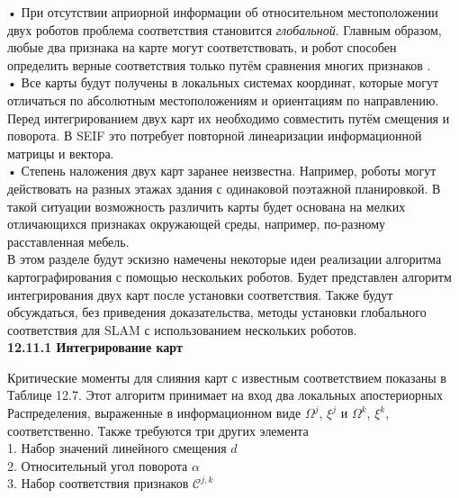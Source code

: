 \documentclass[10pt,a4paper]{article}
\begin{document}
•	При отсутствии априорной информации об относительном местоположении двух роботов проблема соответствия становится \textit{глобальной}. Главным образом, любые два признака на карте могут соответствовать, и робот способен определить верные соответствия только путём сравнения многих признаков .\\

•	Все карты будут получены в локальных системах координат, которые могут отличаться по абсолютным местоположениям и ориентациям по направлению. Перед интегрированием двух карт их необходимо совместить путём смещения и поворота. В SEIF это потребует повторной линеаризации информационной матрицы и вектора.\\

•	Степень наложения двух карт заранее неизвестна. Например, роботы могут действовать на разных этажах здания с одинаковой поэтажной планировкой. В такой ситуации возможность различить карты будет основана на мелких отличающихся признаках окружающей среды, например, по-разному расставленная мебель.\\

В этом разделе будут эскизно намечены некоторые идеи реализации алгоритма картографирования с помощью нескольких роботов. Будет представлен алгоритм интегрирования двух карт после установки соответствия. Также будут обсуждаться, без приведения доказательства, методы установки глобального соответствия для SLAM с использованием нескольких роботов.\\

\textbf{12.11.1	Интегрирование карт}

Критические моменты для слияния карт с известным соответствием показаны в Таблице 12.7. Этот алгоритм принимает на вход два локальных апостериорных Распределения, выраженные в информационном виде $\varOmega^j$, $\xi^j$ и $\varOmega^k$, $\xi^k$, соответственно. Также требуются три других элемента\\

1.	Набор значений линейного смещения $d$\\

2.	Относительный  угол поворота $\alpha$\\

3.	Набор соответствия признаков  $\mathcal{C}^{j,k}$
\end{document}
